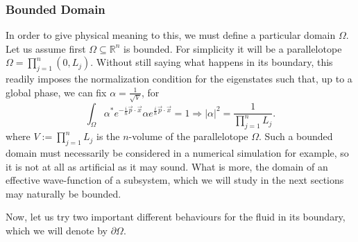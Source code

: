 \documentclass[11pt, a4paper]{article} %
\newcommand{\R}{\mathbb{R}} %
\begin{document}
\subsubsection*{Bounded Domain}
In order to give physical meaning to this, we must define a particular domain $\Omega$. Let us assume first $\Omega\subseteq \R^n$ is bounded. For simplicity it will be a parallelotope $\Omega=\prod_{j=1}^n(0,L_j)$. Without still saying what happens in its boundary, this readily imposes the normalization condition for the eigenstates such that, up to a global phase, we can fix $\alpha=\frac{1}{\sqrt{V}}$, for
\begin{equation}
\int_\Omega \alpha^*e^{-\frac{i}{\hbar}\vec{p}\cdot \vec{x}}\alpha e^{\frac{i}{\hbar}\vec{p}\cdot \vec{x}}=1\Longrightarrow |\alpha|^2=\frac{1}{\prod_{j=1}^nL_j}.
\end{equation}
where $V:=\prod_{j=1}^nL_j$ is the $n$-volume of the parallelotope $\Omega$. Such a bounded domain must necessarily be considered in a numerical simulation for example, so it is not at all as artificial as it may sound. What is more, the domain of an effective wave-function of a subsystem, which we will study in the next sections may naturally be bounded.

Now, let us try two important different behaviours for the fluid in its boundary, which we will denote by $\partial \Omega$.
\end{document}
